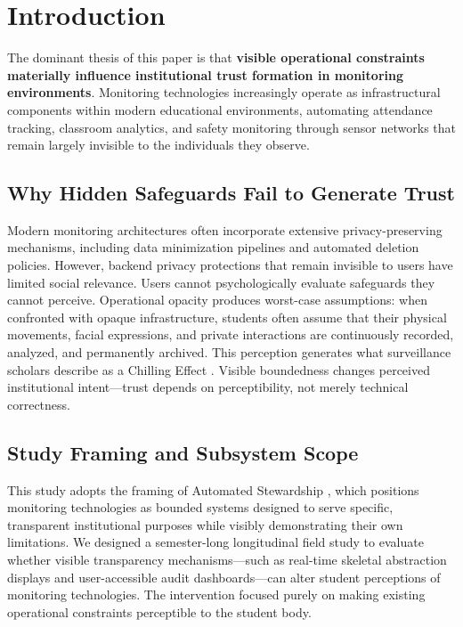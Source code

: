 \documentclass[conference]{IEEEtran}
\begin{document}
\section{Introduction}

The dominant thesis of this paper is that \textbf{visible operational constraints materially influence institutional trust formation in monitoring environments}. Monitoring technologies increasingly operate as infrastructural components within modern educational environments, automating attendance tracking, classroom analytics, and safety monitoring through sensor networks that remain largely invisible to the individuals they observe.

\subsection{Why Hidden Safeguards Fail to Generate Trust}
Modern monitoring architectures often incorporate extensive privacy-preserving mechanisms, including data minimization pipelines and automated deletion policies. However, backend privacy protections that remain invisible to users have limited social relevance. Users cannot psychologically evaluate safeguards they cannot perceive. Operational opacity produces worst-case assumptions: when confronted with opaque infrastructure, students often assume that their physical movements, facial expressions, and private interactions are continuously recorded, analyzed, and permanently archived. This perception generates what surveillance scholars describe as a Chilling Effect \cite{b7}. Visible boundedness changes perceived institutional intent---trust depends on perceptibility, not merely technical correctness.

\subsection{Study Framing and Subsystem Scope}
This study adopts the framing of Automated Stewardship \cite{b13}, which positions monitoring technologies as bounded systems designed to serve specific, transparent institutional purposes while visibly demonstrating their own limitations. We designed a semester-long longitudinal field study to evaluate whether visible transparency mechanisms---such as real-time skeletal abstraction displays and user-accessible audit dashboards---can alter student perceptions of monitoring technologies. The intervention focused purely on making existing operational constraints perceptible to the student body.
\end{document}
